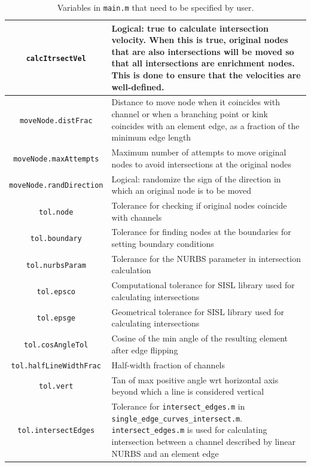 \documentclass[11pt,letterpaper]{article}
\begin{document}
\begin{table}[!h]
\caption{Variables in \texttt{main.m} that need to be specified by user.}

\label{tab_main_variables2}
\centering
\begin{tabular}{|c|L|}
\hline
\texttt{calcItrsectVel}  & Logical: true to calculate intersection velocity. When this is true, original nodes 
that are also intersections will be moved so that all intersections are enrichment nodes. This is done to ensure 
that the velocities are well-defined.   \\
\hline
\texttt{moveNode.distFrac} & Distance to move node when it coincides with channel
or when a branching point or kink coincides with an element edge, as a fraction of the minimum edge length\\ 
\hline
\texttt{moveNode.maxAttempts} & Maximum number of attempts to move original nodes to avoid intersections
at the original nodes \\
\hline
\texttt{moveNode.randDirection} & Logical: randomize the sign of the direction in which an original node is to be moved\\
\hline 
\texttt{tol.node} & Tolerance for checking if original nodes coincide with channels\\
\hline
\texttt{tol.boundary} & Tolerance for finding nodes at the boundaries for setting boundary conditions\\
\hline
\texttt{tol.nurbsParam} & Tolerance for the NURBS parameter in intersection calculation \\
\hline
\texttt{tol.epsco} & Computational tolerance for SISL library used for calculating intersections\\
\hline
\texttt{tol.epsge} & Geometrical tolerance for SISL library used for calculating intersections\\
\hline
\texttt{tol.cosAngleTol} & Cosine of the min angle of the resulting element after edge flipping\\
\hline
\texttt{tol.halfLineWidthFrac} &  Half-width fraction of channels\\
\hline
\texttt{tol.vert} & Tan of max positive angle wrt horizontal axis beyond which a line is considered vertical\\
\hline
\texttt{tol.intersectEdges} & Tolerance for \texttt{intersect\_edges.m} in \texttt{single\_edge\_curves\_intersect.m}. 
\texttt{intersect\_edges.m} is used for calculating intersection between a channel described by linear NURBS and an element edge\\

\end{tabular}
\end{table}
\end{document}

